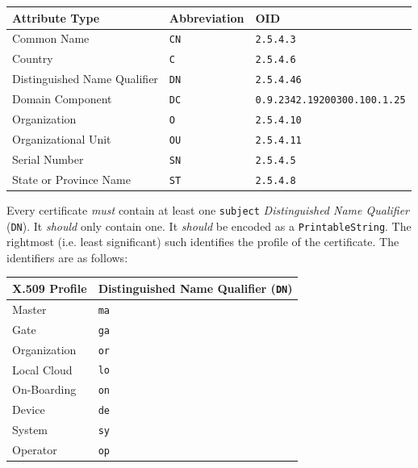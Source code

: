 \vspace*{0.5cm}
\noindent\begin{tabularx}{\textwidth}{| p{5cm} | p{3cm} | X |} \hline
\rowcolor{gray!33} Attribute Type & Abbreviation & OID \\ \hline

Common Name                       & \texttt{CN}  & \texttt{2.5.4.3} \\ \hline
Country                           & \texttt{C}   & \texttt{2.5.4.6}  \\ \hline
Distinguished Name Qualifier      & \texttt{DN}  & \texttt{2.5.4.46} \\ \hline
Domain Component                  & \texttt{DC}  & \texttt{0.9.2342.19200300.100.1.25} \\ \hline
Organization                      & \texttt{O}   & \texttt{2.5.4.10} \\ \hline
Organizational Unit               & \texttt{OU}  & \texttt{2.5.4.11} \\ \hline
Serial Number                     & \texttt{SN}  & \texttt{2.5.4.5} \\ \hline
State or Province Name            & \texttt{ST}  & \texttt{2.5.4.8} \\ \hline

\end{tabularx}
\vspace*{0.5cm}

Every certificate \textit{must} contain at least one \texttt{subject} \textit{Distinguished Name Qualifier} (\texttt{DN}).
It \textit{should} only contain one.
It \textit{should} be encoded as a \texttt{PrintableString}.
The rightmost (i.e. least significant) such identifies the profile of the certificate.
The identifiers are as follows:

\vspace*{0.5cm}
\noindent\begin{tabularx}{\textwidth}{| p{3cm} | X |} \hline
\rowcolor{gray!33} X.509 Profile  & Distinguished Name Qualifier (\texttt{DN}) \\ \hline

Master                            & \texttt{ma} \\ \hline
Gate                              & \texttt{ga} \\ \hline
Organization                      & \texttt{or} \\ \hline
Local Cloud                       & \texttt{lo} \\ \hline
On-Boarding                       & \texttt{on} \\ \hline
Device                            & \texttt{de} \\ \hline
System                            & \texttt{sy} \\ \hline
Operator                          & \texttt{op} \\ \hline

\end{tabularx}
\vspace*{0.5cm}

